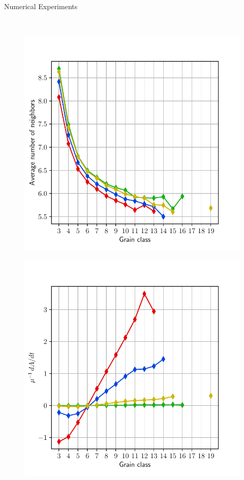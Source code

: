 \documentclass[usenames,dvipsnames]{beamer}
\begin{document}
\begin{frame}{Numerical Experiments}
\begin{minipage}{0.5\textwidth}
\begin{figure}
\end{figure}
\end{minipage}\\
\begin{minipage}{0.5\textwidth}
\begin{figure}
    \includegraphics[trim={0 1em 0 3em},clip=true,scale=0.35]{figures/coupled_model/new_data/avg.pdf}
\end{figure}
\end{minipage}%
\begin{minipage}{0.5\textwidth}
\begin{figure}
    \includegraphics[trim={0 1em 0 3em},clip=true,scale=0.35]{figures/coupled_model/new_data/dAdt.pdf}

\end{figure}
\end{minipage}
\end{frame}
\end{document}
